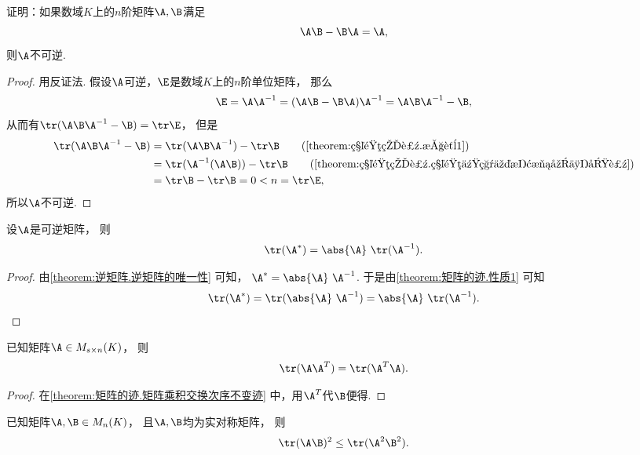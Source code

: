 \begin{example}
证明：如果数域\(K\)上的\(n\)阶矩阵\(\A,\B\)满足\[
	\A\B-\B\A=\A,
\]
则\(\A\)不可逆.
\begin{proof}
用反证法.
假设\(\A\)可逆，\(\E\)是数域\(K\)上的\(n\)阶单位矩阵，
那么\begin{gather*}
	\E = \A\A^{-1}
	= (\A\B-\B\A)\A^{-1} %
	= \A\B\A^{-1}-\B,
\end{gather*}
从而有\(\tr(\A\B\A^{-1}-\B) = \tr\E\)，
但是\begin{align*}
	\tr(\A\B\A^{-1}-\B)
	&= \tr(\A\B\A^{-1})-\tr\B
		\tag{\cref{theorem:矩阵的迹.性质1}} \\
	&= \tr(\A^{-1}(\A\B))-\tr\B
		\tag{\cref{theorem:矩阵的迹.矩阵乘积交换次序不变迹}} \\
	&= \tr\B-\tr\B
	= 0
	< n = \tr\E,
\end{align*}
所以\(\A\)不可逆.
\end{proof}
\end{example}

\begin{property}
设\(\A\)是可逆矩阵，
则\begin{equation}
	\tr(\A^*) = \abs{\A}~\tr(\A^{-1}).
\end{equation}
\begin{proof}
由\cref{theorem:逆矩阵.逆矩阵的唯一性} 可知，
\(\A^* = \abs{\A}~\A^{-1}\).
于是由\cref{theorem:矩阵的迹.性质1} 可知\[
	\tr(\A^*) = \tr(\abs{\A}~\A^{-1}) = \abs{\A}~\tr(\A^{-1}).
	\qedhere
\]
\end{proof}
\end{property}

\begin{property}
已知矩阵\(\A \in M_{s \times n}(K)\)，
则\begin{equation}
	\tr(\A\A^T) = \tr(\A^T\A).
\end{equation}
\begin{proof}
在\cref{theorem:矩阵的迹.矩阵乘积交换次序不变迹} 中，用\(\A^T\)代\(\B\)便得.
\end{proof}
\end{property}

\begin{property}
已知矩阵\(\A,\B \in M_n(K)\)，
且\(\A,\B\)均为实对称矩阵，
则\begin{equation}
	\tr(\A\B)^2 \leq \tr(\A^2\B^2).
\end{equation}
\end{property}

